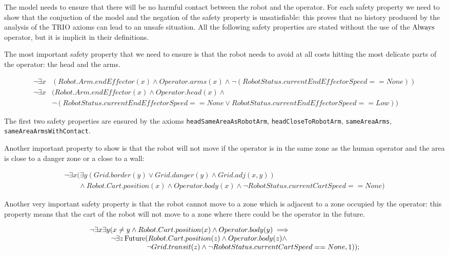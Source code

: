 The model needs to ensure that there will be no harmful contact between the robot and the operator. For each safety property we need to show that the conjuction of the model and the negation of the safety property is unsatisfiable: this proves that no history produced by the analysis of the TRIO axioms can lead to an unsafe situation. All the following safety properties are stated without the use of the $\operatorname{Always}$ operator, but it is implicit in their definitions.

The most important safety property that we need to ensure is that the robot needs to avoid at all costs hitting the most delicate parts of the operator: the head and the arms.

\begin{align*}
\neg \exists x &(Robot.Arm.endEffector(x) \land Operator.arms(x) \land \neg (RobotStatus.currentEndEffectorSpeed == None)) \\
\neg \exists x &(Robot.Arm.endEffector(x) \land Operator.head(x) \land \\
&\neg (RobotStatus.currentEndEffectorSpeed == None \lor RobotStatus.currentEndEffectorSpeed == Low)) 
\end{align*}

The first two safety properties are ensured by the axioms \texttt{headSameAreaAsRobotArm}, \texttt{headCloseToRobotArm}, \texttt{sameAreaArms}, \texttt{sameAreaArmsWithContact}.

Another important property to show is that the robot will not move if the operator is in the same zone as the human operator and the area is close to a danger zone or a close to a wall:

\begin{equation*}
  \begin{array}{l}
  \neg \exists x (\exists y (Grid.border(y) \lor Grid.danger(y) \land Grid.adj(x, y)) \\
  \qquad \land Robot.Cart.position(x) \land Operator.body(x) \land \neg RobotStatus.currentCartSpeed == None)
  \end{array}
\end{equation*}

Another very important safety property is that the robot cannot move to a zone which is adjacent to a zone occupied by the operator: this property means that the cart of the robot will not move to a zone where there could be the operator in the future.

\begin{equation*}
  \begin{array}{lll}
  \neg \exists x \exists y (x \neq y \land Robot.Cart.position(x) \land Operator.body(y) \implies \\
  \qquad \quad \neg \exists z \operatorname{Future}(Robot.Cart.position(z) \land Operator.body(z) \land \\
  \qquad \qquad \qquad \qquad \neg Grid.transit(z) \land \neg RobotStatus.currentCartSpeed == None, 1));
  \end{array}
\end{equation*}

